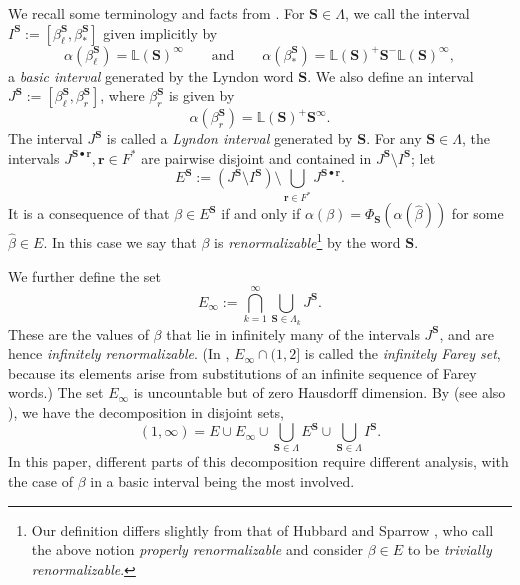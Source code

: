 \documentclass[11pt]{amsart}
\theoremstyle{definition}
\theoremstyle{remark}
\numberwithin{equation}{section}
\renewcommand{\L}{\ensuremath{\mathbb{L}}}
\newcommand{\F}{F^*}
\newcommand{\cs}{ {\mathbf{S}}}
\renewcommand{\r}{ {\mathbf{r}}}
\newcommand{\f}{\infty}
\newcommand{\al}{\alpha}
\newcommand{\La}{\Lambda}
\begin{document}
\medskip
We recall some terminology and facts from \cite{Allaart-Kong-2021}.
For $\cs\in\La$, we call the interval $I^\cs:=[\beta_\ell^\cs,\beta_*^\cs]$ given implicitly by
\[
\al(\beta_\ell^\cs)=\L(\cs)^\f \qquad\mbox{and}\qquad \al(\beta_*^\cs)=\L(\cs)^+\cs^-\L(\cs)^\f,
\]
a {\em basic interval} generated by the Lyndon word $\cs$. We also define an interval $J^\cs:=[\beta_\ell^\cs,\beta_r^\cs]$, where $\beta_r^\cs$ is given by
\[
\al(\beta_r^\cs)=\L(\cs)^+\cs^\f.
\]
The interval $J^\cs$ is called a {\em Lyndon interval} generated by $\cs$.
For any $\cs\in\La$, the intervals $J^{\cs\bullet\r}, \r\in\F$ are pairwise disjoint and contained in $J^\cs\setminus I^\cs$; let
\begin{equation} \label{eq:relative-E}
E^\cs:=(J^\cs\setminus I^\cs)\setminus\bigcup_{\r\in\F}J^{\cs\bullet\r}.
\end{equation}
It is a consequence of \cite[Proposition 5.4]{Allaart-Kong-2021} that $\beta\in E^\cs$ if and only if $\al(\beta)=\Phi_\cs(\al(\hat{\beta}))$ for some $\hat{\beta}\in E$. In this case we say that $\beta$ is {\em renormalizable}\footnote{Our definition differs slightly from that of Hubbard and Sparrow \cite{Hubbard-Sparrow-1990}, who call the above notion {\em properly renormalizable} and consider $\beta\in E$ to be {\em trivially renormalizable}.} by the word $\cs$.

We further define the set
\begin{equation} \label{eq:E_f}
E_\f:=\bigcap_{k=1}^\f\bigcup_{\cs\in\La_k}J^{\cs}.
\end{equation}
These are the values of $\beta$ that lie in infinitely many of the intervals $J^{\cs}$, and are hence {\em infinitely renormalizable}. (In \cite{Allaart-Kong-2021}, $E_\f\cap(1,2]$ is called the {\em infinitely Farey set}, because its elements arise from substitutions of an infinite sequence of Farey words.) The set $E_\f$ is uncountable but of zero Hausdorff dimension.
By \cite[Theorem 3]{Allaart-Kong-2021} {(see also \cite{Allaart-Kong-2024})}, we have the decomposition in disjoint sets,
\begin{equation} \label{eq:decomposition}
{(1,\f)}=E\cup E_\f\cup\bigcup_{\cs\in\La}E^{\cs}\cup\bigcup_{\cs\in\La}I^{\cs}.
\end{equation}
In this paper, different parts of this decomposition require different analysis, with the case of $\beta$ in a basic interval being the most involved.
\end{document}
